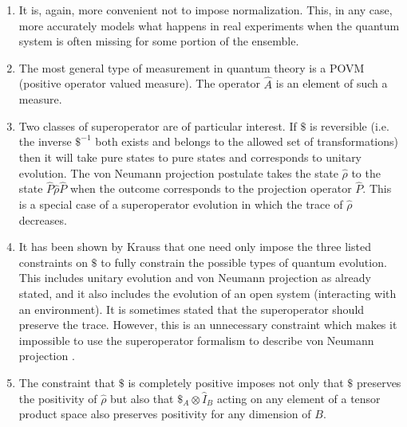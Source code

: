 \documentclass[12pt]{article}
\begin{document}
\begin{enumerate}
\item It is, again, more convenient not to impose normalization. This,
in any case, more accurately models what happens in real experiments when
the quantum system is often missing for some portion of the ensemble.
\item The most general type of measurement in quantum theory is a POVM
(positive operator valued measure).  The operator $\hat{A}$ is an
element of such a measure.
\item Two classes of superoperator are of particular interest.  If $\$ $
is reversible (i.e. the inverse $\$^{-1} $ both exists and belongs to
the allowed set of transformations)
then it will take pure states to pure states and
corresponds to unitary evolution.  The von Neumann projection
postulate takes the state $\hat{\rho}$ to the state
$\hat{P}\hat{\rho}\hat{P}$ when the outcome corresponds to the
projection operator $\hat{P}$.  This is a special case of a
superoperator evolution in which the trace of $\hat{\rho}$
decreases.
\item It has been shown by Krauss \cite{krauss} that one need only
impose the three
listed constraints on $\$ $ to fully constrain the possible types of quantum
evolution.  This includes unitary evolution and von Neumann projection
as already stated, and it also includes the evolution of an open system
(interacting with an environment). It is sometimes stated that the
superoperator should preserve the trace.  However, this is an
unnecessary constraint which makes it impossible to use the superoperator
formalism to describe von Neumann projection \cite{Nielsenchuang}.
\item The constraint that $\$ $ is completely positive imposes  not only
that $\$ $ preserves the positivity of $\hat{\rho}$ but also
that $ \$_A\otimes\hat{I}_B$ acting on any element of a tensor product
space also preserves positivity for any dimension of $B$.
\end{enumerate}
\end{document}
